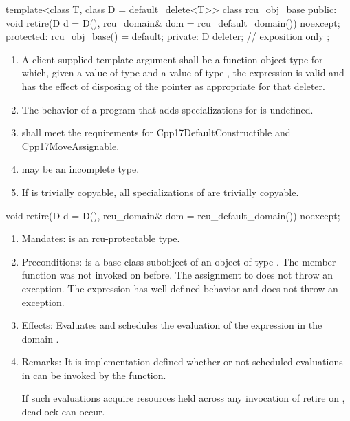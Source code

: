 \begin{codeblock}
template<class T, class D = default_delete<T>>
class rcu_obj_base {
public:
  void retire(D d = D(), rcu_domain& dom = rcu_default_domain()) noexcept;
protected:
  rcu_obj_base() = default;
private:
  D deleter;  // exposition only
};
\end{codeblock}

\begin{enumerate}
\item	A client-supplied template argument  shall be a
	function object type  for which,
	given a value  of type  and a value 
	of type , the expression  is valid and
	has the effect of disposing of the pointer as appropriate for
	that deleter.
\item	The behavior of a program that adds specializations for
	 is undefined.
\item	{} shall meet the requirements for
	Cpp17DefaultConstructible and Cpp17MoveAssignable.
\item	{} may be an incomplete type.
\item	If  is trivially copyable, all specializations of
	 are trivially copyable.
\end{enumerate}

\begin{codeblock}
  void retire(D d = D(), rcu_domain& dom = rcu_default_domain()) noexcept;
\end{codeblock}

\begin{enumerate}
\item	Mandates:  is an rcu-protectable type.
\item	Preconditions:  is a base class subobject of
	an object  of type . The member function
	 was not invoked on 
	before. The assignment to  does not throw an
	exception. The expression  has
	well-defined behavior and does not throw an exception.
\item	Effects: Evaluates  and schedules
	the evaluation of the expression 
	in the domain .
\item	Remarks: It is implementation-defined whether or not scheduled
	evaluations in  can be invoked by the 
	function.
	\begin{note}
	If such evaluations acquire resources held across any invocation of
	retire on , deadlock can occur.
	\end{note}
\end{enumerate}

